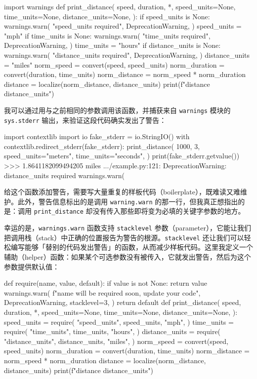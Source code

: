 \begin{codebox}[python]
import warnings
def print_distance(
    speed,
    duration,
    *,
    speed_units=None,
    time_units=None,
    distance_units=None,
):
    if speed_units is None:
        warnings.warn(
            "speed_units required",
            DeprecationWarning,
        )
        speed_units = "mph"
    if time_units is None:
        warnings.warn(
            "time_units required",
            DeprecationWarning,
        )
        time_units = "hours"
    if distance_units is None:
        warnings.warn(
            "distance_units required",
            DeprecationWarning,
        )
        distance_units = "miles"
    norm_speed = convert(speed, speed_units)
    norm_duration = convert(duration, time_units)
    norm_distance = norm_speed * norm_duration
    distance = localize(norm_distance, distance_units)
    print(f"{distance} {distance_units}")
\end{codebox}

我可以通过用与之前相同的参数调用该函数，并捕获来自 \texttt{warnings} 模块的 \texttt{sys.stderr} 输出，来验证这段代码确实发出了警告：

\begin{codebox}[python]
import contextlib
import io
fake_stderr = io.StringIO()
with contextlib.redirect_stderr(fake_stderr):
    print_distance(
        1000,
        3,
        speed_units="meters",
        time_units="seconds",
    )
print(fake_stderr.getvalue())
>>>
1.8641182099494205 miles
.../example.py:121: DeprecationWarning: distance_units required
  warnings.warn(
\end{codebox}

给这个函数添加警告，需要写大量重复的样板代码（boilerplate），既难读又难维护。此外，警告信息标出的是调用 \texttt{warning.warn} 的那一行，但我真正想指出的是：调用 \texttt{print\_distance} 却没有传入那些即将变为必填的关键字参数的地方。

幸运的是，\texttt{warnings.warn} 函数支持 \texttt{stacklevel} 参数（parameter），它能让我们把调用栈（stack）中正确的位置报告为警告的根源。\texttt{stacklevel} 还让我们可以轻松编写能够「替别的代码发出警告」的函数，从而减少样板代码。这里我定义一个辅助（helper）函数：如果某个可选参数没有被传入，它就发出警告，然后为这个参数提供默认值：

\begin{codebox}[python]
def require(name, value, default):
    if value is not None:
        return value
    warnings.warn(
        f"{name} will be required soon, update your code",
        DeprecationWarning,
        stacklevel=3,
    )
    return default
def print_distance(
    speed,
    duration,
    *,
    speed_units=None,
    time_units=None,
    distance_units=None,
):
    speed_units = require(
        "speed_units",
        speed_units,
        "mph",
    )
    time_units = require(
        "time_units",
        time_units,
        "hours",
    )
    distance_units = require(
        "distance_units",
        distance_units,
        "miles",
    )
    norm_speed = convert(speed, speed_units)
    norm_duration = convert(duration, time_units)
    norm_distance = norm_speed * norm_duration
    distance = localize(norm_distance, distance_units)
    print(f"{distance} {distance_units}")
\end{codebox}

